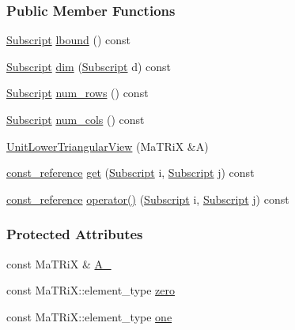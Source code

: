 \subsubsection*{Public Member Functions}
\begin{DoxyCompactItemize}
\item 
\hyperlink{namespace_t_n_t_af22e3f1460e145c04ce4e7d701e4c1c1}{Subscript} \hyperlink{class_t_n_t_1_1_unit_lower_triangular_view_ae1e6502cba038728b6ef9f1cf98046f8}{lbound} () const 
\item 
\hyperlink{namespace_t_n_t_af22e3f1460e145c04ce4e7d701e4c1c1}{Subscript} \hyperlink{class_t_n_t_1_1_unit_lower_triangular_view_a7c2011c8632f95af5cce867e9db573da}{dim} (\hyperlink{namespace_t_n_t_af22e3f1460e145c04ce4e7d701e4c1c1}{Subscript} d) const 
\item 
\hyperlink{namespace_t_n_t_af22e3f1460e145c04ce4e7d701e4c1c1}{Subscript} \hyperlink{class_t_n_t_1_1_unit_lower_triangular_view_a45557d06ba672904dd9725ccfef97213}{num\_\-rows} () const 
\item 
\hyperlink{namespace_t_n_t_af22e3f1460e145c04ce4e7d701e4c1c1}{Subscript} \hyperlink{class_t_n_t_1_1_unit_lower_triangular_view_addeacb9746e41474e377d3e30a97c411}{num\_\-cols} () const 
\item 
\hyperlink{class_t_n_t_1_1_unit_lower_triangular_view_a07fa5337fe551b707ff71289eff748d2}{UnitLowerTriangularView} (MaTRiX \&A)
\item 
\hyperlink{class_t_n_t_1_1_unit_lower_triangular_view_a7792363220cbf3c2d5264a01f66b4c70}{const\_\-reference} \hyperlink{class_t_n_t_1_1_unit_lower_triangular_view_a8c4920417141000dfe253a6f8742942a}{get} (\hyperlink{namespace_t_n_t_af22e3f1460e145c04ce4e7d701e4c1c1}{Subscript} i, \hyperlink{namespace_t_n_t_af22e3f1460e145c04ce4e7d701e4c1c1}{Subscript} j) const 
\item 
\hyperlink{class_t_n_t_1_1_unit_lower_triangular_view_a7792363220cbf3c2d5264a01f66b4c70}{const\_\-reference} \hyperlink{class_t_n_t_1_1_unit_lower_triangular_view_ace2c8432b47a4206730a9ff93a363dbc}{operator()} (\hyperlink{namespace_t_n_t_af22e3f1460e145c04ce4e7d701e4c1c1}{Subscript} i, \hyperlink{namespace_t_n_t_af22e3f1460e145c04ce4e7d701e4c1c1}{Subscript} j) const 
\end{DoxyCompactItemize}
\subsubsection*{Protected Attributes}
\begin{DoxyCompactItemize}
\item 
const MaTRiX \& \hyperlink{class_t_n_t_1_1_unit_lower_triangular_view_a85e3f34ac958e6279b90730a3400111e}{A\_\-}
\item 
const MaTRiX::element\_\-type \hyperlink{class_t_n_t_1_1_unit_lower_triangular_view_a573785e76609e40a73ea6af93e0d0cd9}{zero}
\item 
const MaTRiX::element\_\-type \hyperlink{class_t_n_t_1_1_unit_lower_triangular_view_a1e4983e587ea9fda68596ab096261fa0}{one}
\end{DoxyCompactItemize}


